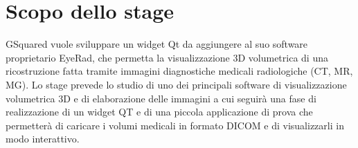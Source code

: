 \section*{Scopo dello stage}
GSquared vuole sviluppare un widget Qt da aggiungere al suo software proprietario EyeRad, che permetta la visualizzazione 3D volumetrica di una ricostruzione fatta tramite immagini diagnostiche medicali radiologiche (CT, MR, MG). Lo stage prevede lo studio di uno dei principali software di visualizzazione volumetrica 3D e di elaborazione delle immagini a cui seguirà una fase di realizzazione di un widget QT e di una piccola applicazione di prova che permetterà di caricare i volumi medicali in formato DICOM e di visualizzarli in modo interattivo.



